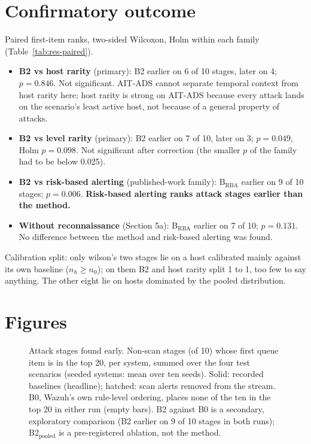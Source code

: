 \documentclass[10pt,a4paper]{article}
\begin{document}
\section{Confirmatory outcome}
Paired first-item ranks, two-sided Wilcoxon, Holm within each family (Table~\ref{tab:res-paired}).
\begin{itemize}
\item \textbf{B2 vs host rarity} (primary): B2 earlier on 6 of 10 stages, later on 4; $p = 0.846$. Not significant. AIT-ADS cannot separate temporal context from host rarity here; host rarity is strong on AIT-ADS because every attack lands on the scenario's least active host, not because of a general property of attacks.
\item \textbf{B2 vs level rarity} (primary): B2 earlier on 7 of 10, later on 3; $p = 0.049$, Holm $p = 0.098$. Not significant after correction (the smaller $p$ of the family had to be below 0.025).
\item \textbf{B2 vs risk-based alerting} (published-work family): B$_\mathrm{RBA}$ earlier on 9 of 10 stages; $p = 0.006$. \textbf{Risk-based alerting ranks attack stages earlier than the method.}
\item \textbf{Without reconnaissance} (Section 5a): B$_\mathrm{RBA}$ earlier on 7 of 10; $p = 0.131$. No difference between the method and risk-based alerting was found.
\end{itemize}
Calibration split: only wilson's two stages lie on a host calibrated mainly against its own baseline ($n_h \ge n_0$); on them B2 and host rarity split 1 to 1, too few to say anything. The other eight lie on hosts dominated by the pooled distribution.

\section{Figures}

\begin{figure}[h]
\centering

\caption{Attack stages found early. Non-scan stages (of 10) whose first queue item is in the top 20, per system, summed over the four test scenarios (seeded systems: mean over ten seeds). Solid: recorded baselines (headline); hatched: scan alerts removed from the stream. B0, Wazuh's own rule-level ordering, places none of the ten in the top 20 in either run (empty bars). B2 against B0 is a secondary, exploratory comparison (B2 earlier on 9 of 10 stages in both runs); B2$_\mathrm{pooled}$ is a pre-registered ablation, not the method.}
\label{fig:coverage}
\end{figure}
\end{document}
